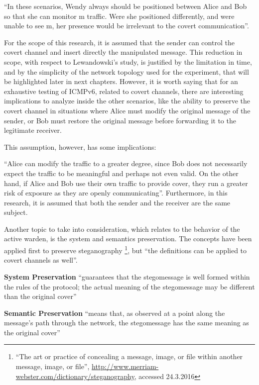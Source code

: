 \documentclass[12pt]{article}
\begin{document}
``In these scenarios, Wendy always should be positioned between Alice and Bob so that she can monitor m\textprime\hspace{2pt} traffic. Were she positioned differently, and were unable to see m\textprime, her presence would be irrelevant to the covert communication''.

For the scope of this research, it is assumed that the sender can control the covert channel and insert directly the manipulated message. This reduction in scope, with respect to Lewandowski's study, is justified by the limitation in time, and by the simplicity of the network topology used for the experiment, that will be highlighted later in next chapters. However, it is worth saying that for an exhaustive testing of ICMPv6, related to covert channels, there are interesting implications to analyze inside the other scenarios, like the ability to preserve the covert channel in situations where Alice must modify the original message of the sender, or Bob must restore the original message before forwarding it to the legitimate receiver.

This assumption, however, has some implications:

``Alice can modify the traffic to a greater degree, since Bob does not necessarily expect the traffic to be meaningful and perhaps not even valid. On the other hand, if Alice and Bob use their own traffic to provide cover, they run a greater risk of exposure as they are openly communicating''. Furthermore, in this research, it is assumed that both the sender and the receiver are the same subject.

Another topic to take into consideration, which relates to the behavior of the active warden, is the system and semantics preservation. The concepts have been applied first to preserve steganography \footnote{``The art or practice of concealing a message, image, or file within another message, image, or file'', \url{http://www.merriam-webster.com/dictionary/steganography}, accessed 24.3.2016}\cite{lucena2}, but ``the definitions can be applied to covert channels as well''\cite{netaware}.

\textbf{System Preservation} ``guarantees that the stegomessage is well formed within the rules of the protocol; the actual meaning of the stegomessage may be different than the original cover''\cite{lucena2}

\textbf{Semantic Preservation} ``means that, as observed at a point along the message’s path through the network, the stegomessage has the same meaning as the original cover''\cite{lucena2}
\end{document}
